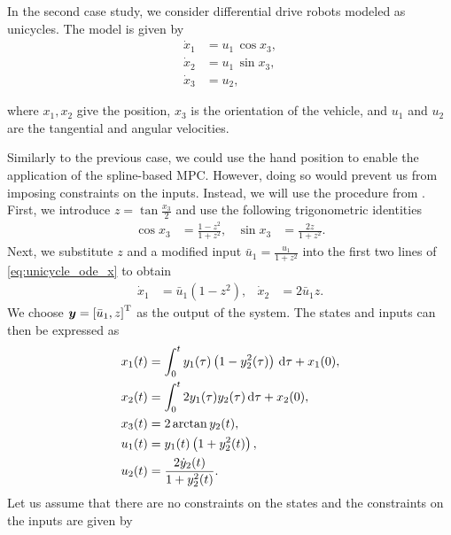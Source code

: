 In the second case study, we consider differential drive robots modeled as unicycles.
The model is given by
\begin{subequations}
    \begin{align}
        \dot{x}_1 &= u_1\,\cos x_3, \\
        \dot{x}_2 &= u_1\,\sin x_3, \\
        \dot{x}_3 &= u_2,
    \end{align} \label{eq:unicycle_ode_x} 
\end{subequations}

\noindent where $x_1, x_2$ give the position, $x_3$ is the orientation of the vehicle, and $u_1$ and $u_2$ are the tangential and angular velocities.

Similarly to the previous case, we could use the hand position to enable the application of the spline-based MPC.
However, doing so would prevent us from imposing constraints on the inputs.
Instead, we will use the procedure from \cite{van_parys_2017_DMPC}.
First, we introduce $z = \tan \frac{x_3}{2}$ and use the following trigonometric identities 
\begin{align}
    \cos x_3 &= \frac{1 - z^2}{1 + z^2}, &
    \sin x_3 &= \frac{2z}{1 + z^2}. 
\end{align}
Next, we substitute $z$ and a modified input $\bar{u}_1 = \frac{u_1}{1 + z^2}$ into the first two lines of \eqref{eq:unicycle_ode_x} to obtain 
\begin{align}
    \dot{x}_1 &= \bar{u}_1 \left(1 - z^2\right), &
    \dot{x}_2 &= 2 \bar{u}_1 z. 
\end{align}
We choose $\bm{y} = \left[\bar{u}_1, z\right]^{\mathrm{T}}$ as the output of the system.
The states and inputs can then be expressed as 
\begin{subequations}
    \begin{align}
        x_1(t) &= \int_{0}^t y_1(\tau) \left(1 - y_2^2(\tau)\right)\, {\rm d}\tau + x_1(0), \\
        x_2(t) &= \int_{0}^t 2 y_1(\tau) y_2(\tau)\, {\rm d}\tau + x_2(0), \\
        x_3(t) &= 2 \arctan y_2(t), \\
        u_1(t) &= y_1(t) \left(1 + y_2^2(t)\right), \label{eq:unicycle_u1} \\
        u_2(t) &= \frac{2 \dot{y}_2(t)}{1 + y_2^2(t)}. \label{eq:unicycle_u2}
    \end{align} \label{eq:unicycle_transform} 
\end{subequations}
Let us assume that there are no constraints on the states and the constraints on the inputs are given by
